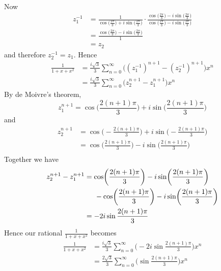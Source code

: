 Now
\begin{align*}
z_1^{-1} 
&= \frac{1}{\cos \bigl( \frac{2\pi}{3} \bigr) + i \sin \bigl( \frac{2\pi}{3} \bigl)}
\cdot \frac{\cos \bigl( \frac{2\pi}{3} \bigr) - i \sin \bigl( \frac{2\pi}{3} \bigl)}{\cos \bigl( \frac{2\pi}{3} \bigr) - i \sin \bigl( \frac{2\pi}{3} \bigl)} \\
&= \frac{\cos \bigl( \frac{2\pi}{3} \bigr) - i \sin \bigl( \frac{2\pi}{3} \bigl)}{1} \\
&= z_2
\end{align*}
and therefore $z_2^{-1} = z_1$.
Hence
\begin{align*}
\frac{1}{1 + x + x^2}
&=
\frac{i\sqrt{3}}{3}
\sum_{n=0}^\infty 
\biggl( 
(z_1^{-1})^{n+1}  
-  (z_2^{-1})^{n+1} 
\biggr) 
x^n \\
&=
\frac{i\sqrt{3}}{3}
\sum_{n=0}^\infty 
\biggl( 
z_2^{n+1}  
-  z_1^{n+1} 
\biggr) 
x^n
\end{align*}
By de Moivre's theorem,
\[
z_1^{n+1} = \cos \biggl( \frac{2(n+1)\pi}{3} \biggr) + i \sin \biggl( \frac{2(n+1)\pi}{3} \biggl)
\]
and
\begin{align*}
z_2^{n+1} 
&= \cos \biggl( -\frac{2(n+1)\pi}{3} \biggr) + i \sin \biggl( -\frac{2(n+1)\pi}{3} \biggl) \\
&= \cos \biggl( \frac{2(n+1)\pi}{3} \biggr) - i \sin \biggl( \frac{2(n+1)\pi}{3} \biggl) \\
\end{align*}
Together we have
\begin{align*}
z_2^{n+1} - z_1^{n+1}
&= \cos \biggl( \frac{2(n+1)\pi}{3} \biggr) - i \sin \biggl( \frac{2(n+1)\pi}{3} \biggl) \\
&\hskip 0.5cm -\cos \biggl( \frac{2(n+1)\pi}{3} \biggr) - i \sin \biggl( \frac{2(n+1)\pi}{3} \biggl) \\
&= -2i \sin \frac{2(n+1)\pi}{3}
\end{align*}
Hence our rational $\displaystyle \frac{1}{1+x+x^2}$ becomes
\begin{align*}
\frac{1}{1 + x + x^2}
&= 
\frac{i\sqrt{3}}{3} 
\sum_{n=0}^\infty 
\biggl( -2i \sin \frac{2(n+1)\pi}{3} \biggr) x^n \\
&= 
\frac{2\sqrt{3}}{3} 
\sum_{n=0}^\infty
\biggl( \sin \frac{2(n+1)\pi}{3} \biggr)
x^n \\
\end{align*}

